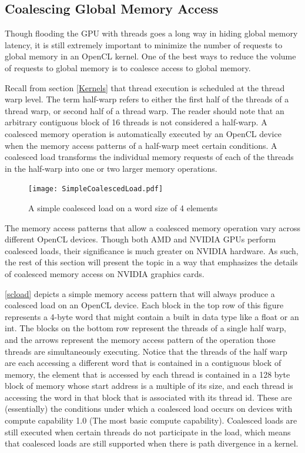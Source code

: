 \documentclass[12pt,twoside]{reedthesis}
\begin{document}
\subsection{Coalescing Global Memory Access}

Though flooding the GPU with threads goes a long way in hiding global memory latency, it is still extremely important to minimize the number of requests to global memory in an OpenCL kernel. One of the best ways to reduce the volume of requests to global memory is to coalesce access to global memory.

Recall from section \ref{Kernels} that thread execution is scheduled at the thread warp level. The term half-warp refers to either the first half of the threads of a thread warp, or second half of a thread warp. The reader should note that an arbitrary contiguous block of 16 threads is not considered a half-warp.
A coalesced memory operation is automatically executed by an OpenCL device when the memory access patterns of a half-warp meet certain conditions. A coalesced load transforms the individual memory requests of each of the threads in the half-warp into one or two larger memory operations.

\begin{figure}[h!]
\begin{center}
\texttt{[image: SimpleCoalescedLoad.pdf]}
\end{center}
\caption{A simple coalesced load on a word size of 4 elements}
\end{figure}
\label{scload}
\vspace{1pc}

The memory access patterns that allow a coalesced memory operation vary across different OpenCL devices. Though both AMD and NVIDIA GPUs perform coalesced loads, their significance is much greater on NVIDIA hardware. As such, the rest of this section will present the topic in a way that emphasizes the details of coalesced memory access on NVIDIA graphics cards.

\ref{scload} depicts a simple memory access pattern that will always produce a coalesced load on an OpenCL device. Each block in the top row of this figure represents a 4-byte word that might contain a built in data type like a float or an int. The blocks on the bottom row represent the threads of a single half warp, and the arrows represent the memory access pattern of the operation those threads are simultaneously executing. Notice that the threads of the half warp are each accessing a different word that is contained in a contiguous block of memory, the element that is accessed by each thread is contained in a 128 byte block of memory whose start address is a multiple of its size, and each thread is accessing the word in that block that is associated with its thread id.
These are (essentially) the conditions under which a coalesced load occurs on devices with compute capability 1.0 (The most basic compute capability). Coalesced loads are still executed when certain threads do not participate in the load, which means that coalesced loads are still supported when there is path divergence in a kernel.
\end{document}
